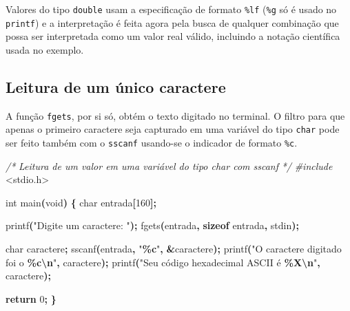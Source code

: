 \documentclass[
  11pt,
  a4paper,
]{scrbook}
\newenvironment{Shaded}{\begin{snugshade}}{\end{snugshade}}
\newcommand{\CommentTok}[1]{\textcolor[rgb]{0.56,0.35,0.01}{\textit{#1}}}
\newcommand{\ControlFlowTok}[1]{\textcolor[rgb]{0.13,0.29,0.53}{\textbf{#1}}}
\newcommand{\DataTypeTok}[1]{\textcolor[rgb]{0.13,0.29,0.53}{#1}}
\newcommand{\DecValTok}[1]{\textcolor[rgb]{0.00,0.00,0.81}{#1}}
\newcommand{\ImportTok}[1]{#1}
\newcommand{\KeywordTok}[1]{\textcolor[rgb]{0.13,0.29,0.53}{\textbf{#1}}}
\newcommand{\NormalTok}[1]{#1}
\newcommand{\OperatorTok}[1]{\textcolor[rgb]{0.81,0.36,0.00}{\textbf{#1}}}
\newcommand{\PreprocessorTok}[1]{\textcolor[rgb]{0.56,0.35,0.01}{\textit{#1}}}
\newcommand{\SpecialCharTok}[1]{\textcolor[rgb]{0.81,0.36,0.00}{\textbf{#1}}}
\newcommand{\StringTok}[1]{\textcolor[rgb]{0.31,0.60,0.02}{#1}}
\begin{document}
Valores do tipo \texttt{double} usam a especificação de formato
\texttt{\%lf} (\texttt{\%g} só é usado no \texttt{printf}) e a
interpretação é feita agora pela busca de qualquer combinação que possa
ser interpretada como um valor real válido, incluindo a notação
científica usada no exemplo.

\subsection{Leitura de um único
caractere}\label{leitura-de-um-uxfanico-caractere}

A função \texttt{fgets}, por si só, obtém o texto digitado no terminal.
O filtro para que apenas o primeiro caractere seja capturado em uma
variável do tipo \texttt{char} pode ser feito também com o
\texttt{sscanf} usando-se o indicador de formato \texttt{\%c}.

\begin{Shaded}
\begin{Highlighting}[]
\CommentTok{/*}
\CommentTok{Leitura de um valor em uma variável do tipo char com sscanf}
\CommentTok{*/}
\PreprocessorTok{\#include }\ImportTok{\textless{}stdio.h\textgreater{}}

\DataTypeTok{int}\NormalTok{ main}\OperatorTok{(}\DataTypeTok{void}\OperatorTok{)} \OperatorTok{\{}
    \DataTypeTok{char}\NormalTok{ entrada}\OperatorTok{[}\DecValTok{160}\OperatorTok{];}

\NormalTok{    printf}\OperatorTok{(}\StringTok{"Digite um caractere: "}\OperatorTok{);}
\NormalTok{    fgets}\OperatorTok{(}\NormalTok{entrada}\OperatorTok{,} \KeywordTok{sizeof}\NormalTok{ entrada}\OperatorTok{,}\NormalTok{ stdin}\OperatorTok{);}

    \DataTypeTok{char}\NormalTok{ caractere}\OperatorTok{;}
\NormalTok{    sscanf}\OperatorTok{(}\NormalTok{entrada}\OperatorTok{,} \StringTok{"}\SpecialCharTok{\%c}\StringTok{"}\OperatorTok{,} \OperatorTok{\&}\NormalTok{caractere}\OperatorTok{);}
\NormalTok{    printf}\OperatorTok{(}\StringTok{"O caractere digitado foi o }\SpecialCharTok{\%c\textbackslash{}n}\StringTok{"}\OperatorTok{,}\NormalTok{ caractere}\OperatorTok{);}
\NormalTok{    printf}\OperatorTok{(}\StringTok{"Seu código hexadecimal ASCII é }\SpecialCharTok{\%X\textbackslash{}n}\StringTok{"}\OperatorTok{,}\NormalTok{ caractere}\OperatorTok{);}

    \ControlFlowTok{return} \DecValTok{0}\OperatorTok{;}
\OperatorTok{\}}
\end{Highlighting}
\end{Shaded}
\end{document}
